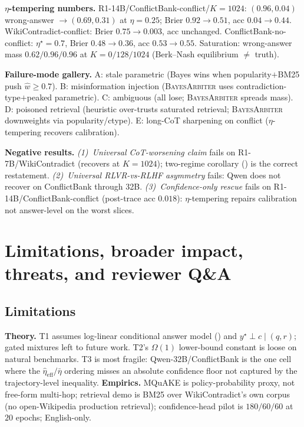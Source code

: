 \textbf{$\eta$-tempering numbers.}
R1-14B/ConflictBank-conflict/$K\!=\!1024$: $(0.96,0.04)$ wrong-answer
$\to\!(0.69,0.31)$ at $\eta\!=\!0.25$; Brier $0.92\!\to\!0.51$,
acc $0.04\!\to\!0.44$.  WikiContradict-conflict: Brier
$0.75\!\to\!0.003$, acc unchanged.  ConflictBank-no-conflict:
$\eta^\star\!=\!0.7$, Brier $0.48\!\to\!0.36$, acc $0.53\!\to\!0.55$.
Saturation: wrong-answer mass $0.62/0.96/0.96$ at
$K\!=\!0/128/1024$ (Berk--Nash equilibrium $\ne$ truth).

\textbf{Failure-mode gallery.}
A: stale parametric (Bayes wins when popularity$+$BM25 push
$\hat w\!\ge\!0.7$).  B: misinformation injection (\textsc{BayesArbiter} uses
contradiction-type$+$peaked parametric).  C: ambiguous (all lose;
\textsc{BayesArbiter} spreads mass).  D: poisoned retrieval (heuristic over-trusts
saturated retrieval; \textsc{BayesArbiter} downweights via popularity/ctype).
E: long-CoT sharpening on conflict ($\eta$-tempering recovers
calibration).

\textbf{Negative results.}
\emph{(1)~Universal CoT-worsening claim} fails on R1-7B/WikiContradict
(recovers at $K\!=\!1024$); two-regime corollary ()
is the correct restatement.
\emph{(2)~Universal RLVR-vs-RLHF asymmetry} fails: Qwen does not recover
on ConflictBank through 32B.
\emph{(3)~Confidence-only rescue} fails on R1-14B/ConflictBank-conflict
(post-trace acc $0.018$): $\eta$-tempering repairs calibration not
answer-level on the worst slices.



\section{Limitations, broader impact, threats, and reviewer Q\&A}
\label{app:letter-M}

\subsection{Limitations}
\label{app:limitations}

\textbf{Theory.}  T1 assumes log-linear conditional answer model
() and $y^\star\!\perp\!c\mid (q,r)$;
gated mixtures left to future work.  T2's $\Omega(1)$ lower-bound
constant is loose on natural benchmarks.  T3 is most fragile:
Qwen-32B/ConflictBank is the one cell where the
$\widehat\eta_{\mathrm{eff}}/\bar\eta$ ordering misses an absolute
confidence floor not captured by the trajectory-level inequality.
\textbf{Empirics.}  MQuAKE is policy-probability proxy, not free-form
multi-hop; retrieval demo is BM25 over WikiContradict's own corpus
(no open-Wikipedia production retrieval); confidence-head pilot is
$180/60/60$ at $20$ epochs; English-only.


